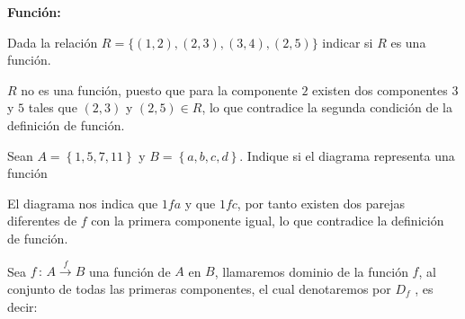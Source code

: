 \begin{ejemplo}{\bf Función:}

Dada la relación $R=\{\left(1,2\right),\left(2,3\right),\left(3,4\right),\left(2,5\right)\}$
indicar si $R$ es una función. \end{ejemplo}

\solu $R$ no es una función, puesto que para la componente $2$
existen dos componentes $3$ y $5$ tales que $\left(2,3\right)$
y $\left(2,5\right)\in R$, lo que contradice la segunda condición
de la definición de función.

\begin{ejemplo}

Sean $A=\left\{ 1,5,7,11\right\} $ y $B=\left\{ a,b,c,d\right\} $.
Indique si el diagrama representa una función

\begin{center}
\end{center}

\end{ejemplo}

\solu  El diagrama nos indica que $1fa$ y que $1fc$, por tanto
existen dos parejas diferentes de $f$ con la primera componente igual,
lo que contradice la definición de función.

\obs Sea $f\,:\,A\overset{f}{\rightarrow}B$ una función de $A$
en $B$, llamaremos dominio de la función $f$, al conjunto de todas
las primeras componentes, el cual denotaremos por $D_{f}$ , es decir:

